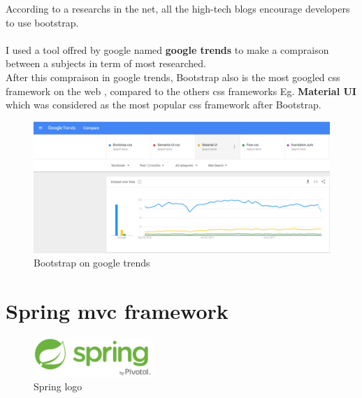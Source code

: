 \documentclass[12pt]{article}
\begin{document}
\vspace{66mm}

According to a researchs in the net, all the high-tech blogs encourage developers to use bootstrap.
\\
\\
 I used a tool offred by google named \textbf{google trends} to make a compraison between a subjects in term of most researched.
 \\
 After this compraison in google trends, Bootstrap also is the most googled css framework on the web , compared to the others css frameworks Eg. \textbf{Material UI} which was considered as the most popular css framework after Bootstrap.

\begin{figure}[h]
	\centering
	\includegraphics[width=1\textwidth]{Boostrap_statics_google_trends.png}
	\caption{Bootstrap on google trends}
\end{figure}
\vspace{66mm}
\section{Spring mvc framework}
\begin{figure}[h]
	\centering
	\includegraphics[width=0.4\textwidth]{Spring_logo.png}
	\caption{Spring logo}
\end{figure}
\end{document}
